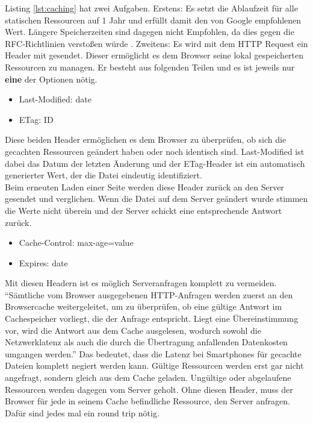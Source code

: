 			  Listing \ref{lst:caching} hat zwei Aufgaben. Erstens: Es setzt die Ablaufzeit für alle statischen Ressourcen auf 1 Jahr und erfüllt damit den von Google empfohlenen Wert. Längere Speicherzeiten sind dagegen nicht Empfohlen, da dies gegen die RFC-Richtlinien verstoßen würde \autocite{google14Caching}. Zweitens: Es wird mit dem HTTP Request ein Header mit gesendet. Dieser ermöglicht es dem Browser seine lokal gespeicherten Ressourcen zu managen. Er besteht aus folgenden Teilen und es ist jeweils nur \textbf{eine} der Optionen nötig.

			  \begin{itemize}
			  	\item Last-Modified: date
			  	\item ETag: ID
			  \end{itemize}

			  Diese beiden Header ermöglichen es dem Browser zu überprüfen, ob sich die gecachten Ressourcen geändert haben oder noch identisch sind. Last-Modified ist dabei das Datum der letzten Änderung und der ETag-Header ist ein automatisch generierter Wert, der die Datei eindeutig identifiziert.\\
			  Beim erneuten Laden einer Seite werden diese Header zurück an den Server gesendet und verglichen. Wenn die Datei auf dem Server geändert wurde stimmen die Werte nicht überein und der Server schickt eine entsprechende Antwort zurück.

			  \begin{itemize}
			  	\item Cache-Control: max-age=value
			  	\item Expires: date
			  \end{itemize}

			  Mit diesen Headern ist es möglich Serveranfragen komplett zu vermeiden. "`Sämtliche vom Browser ausgegebenen HTTP-Anfragen werden zuerst an den Browsercache weitergeleitet, um zu überprüfen, ob eine gültige Antwort im Cachespeicher vorliegt, die der Anfrage entspricht. Liegt eine Übereinstimmung vor, wird die Antwort aus dem Cache ausgelesen, wodurch sowohl die Netzwerklatenz als auch die durch die Übertragung anfallenden Datenkosten umgangen werden."'\autocite{grigorikCaching} Das bedeutet, dass die Latenz bei Smartphones für gecachte Dateien komplett negiert werden kann. Gültige Ressourcen werden erst gar nicht angefragt, sondern gleich aus dem Cache geladen. Ungültige oder abgelaufene Ressourcen werden dagegen vom Server geholt. Ohne diesen Header, muss der Browser für jede in seinem Cache befindliche Ressource, den Server anfragen. Dafür sind jedes mal ein round trip nötig.\\


